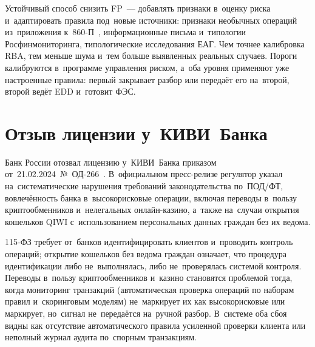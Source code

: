 Устойчивый способ снизить FP~--- добавлять признаки в~оценку риска и~адаптировать
правила под~новые источники: признаки необычных операций из~приложения
к~860-П~\cite{cbr-860p}, информационные письма и~типологии Росфинмониторинга,
типологические исследования ЕАГ. Чем точнее калибровка RBA,
тем меньше шума и~тем больше выявленных реальных случаев. Пороги калибруются
в~программе управления риском, а~оба уровня применяют уже настроенные правила:
первый закрывает разбор или передаёт его на~второй, второй ведёт EDD
и~готовит ФЭС.

\section{Отзыв лицензии у~КИВИ~Банка}\label{sec:aml-qiwi}

Банк России отозвал лицензию у~КИВИ~Банка приказом
от~21.02.2024~№~ОД-266~\cite{cbr-qiwi-license-2024}. В~официальном пресс-релизе
регулятор указал на~систематические нарушения требований законодательства
по~ПОД/ФТ, вовлечённость банка в~высокорисковые операции, включая переводы
в~пользу криптообменников и~нелегальных онлайн-казино, а~также на~случаи
открытия кошельков QIWI с~использованием персональных данных граждан без их
ведома.

115-ФЗ требует от~банков идентифицировать клиентов и~проводить контроль
операций; открытие кошельков без ведома граждан означает, что процедура
идентификации либо не~выполнялась, либо не~проверялась системой контроля.
Переводы в~пользу криптообменников и~казино становятся проблемой тогда, когда
мониторинг транзакций (автоматическая проверка операций по наборам правил
и~скоринговым моделям) не~маркирует их как высокорисковые или маркирует,
но~сигнал не~передаётся на~ручной разбор. В~системе оба сбоя видны
как отсутствие автоматического правила усиленной проверки клиента или неполный
журнал аудита по~спорным транзакциям.


